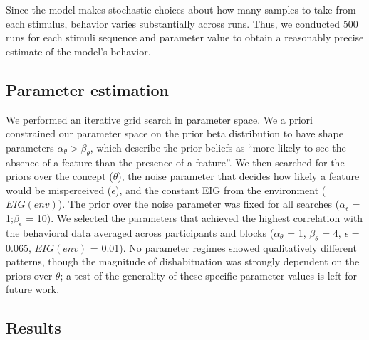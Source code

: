 \documentclass[10pt, letterpaper]{article}
\begin{document}
Since the model makes stochastic choices about how many samples to take
from each stimulus, behavior varies substantially across runs. Thus, we
conducted 500 runs for each stimuli sequence and parameter value to
obtain a reasonably precise estimate of the model's behavior.

\hypertarget{parameter-estimation}{%
\subsection{Parameter estimation}\label{parameter-estimation}}

We performed an iterative grid search in parameter space. We a priori
constrained our parameter space on the prior beta distribution to have
shape parameters \(\alpha_{\theta} > \beta_{\theta}\), which describe
the prior beliefs as ``more likely to see the absence of a feature than
the presence of a feature''. We then searched for the priors over the
concept (\(\theta\)), the noise parameter that decides how likely a
feature would be misperceived (\(\epsilon\)), and the constant EIG from
the environment (\(EIG(env)\)). The prior over the noise parameter was
fixed for all searches (\(\alpha_{\epsilon}\) = 1;\(\beta_{\epsilon}\) =
10). We selected the parameters that achieved the highest correlation
with the behavioral data averaged across participants and blocks
(\(\alpha_{\theta}\) = 1, \(\beta_{\theta}\) = 4, \(\epsilon\) = 0.065,
\(EIG(env)\) = 0.01). No parameter regimes showed qualitatively
different patterns, though the magnitude of dishabituation was strongly
dependent on the priors over \(\theta\); a test of the generality of
these specific parameter values is left for future work.

\hypertarget{results-1}{%
\subsection{Results}\label{results-1}}
\end{document}
